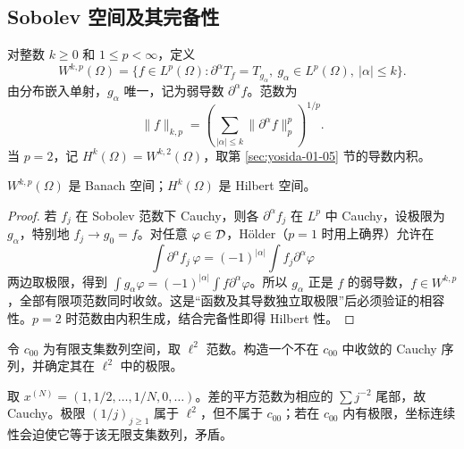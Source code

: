 \subsection{Sobolev 空间及其完备性}
\begin{definition}
对整数 $k\ge0$ 和 $1\le p<\infty$，定义
\[
 W^{k,p}(\Omega)=\{f\in L^p(\Omega):\partial^\alpha T_f=T_{g_\alpha},\
 g_\alpha\in L^p(\Omega),\ |\alpha|\le k\}.
\]
由分布嵌入单射，$g_\alpha$ 唯一，记为弱导数 $\partial^\alpha f$。范数为
\[
 \|f\|_{k,p}=\left(\sum_{|\alpha|\le k}\|\partial^\alpha f\|_p^p\right)^{1/p}.
\]
当 $p=2$，记 $H^k(\Omega)=W^{k,2}(\Omega)$，取第 \ref{sec:yosida-01-05} 节的导数内积。
\end{definition}
\begin{theorem}\label{thm:y1-sobolev-complete}
$W^{k,p}(\Omega)$ 是 Banach 空间；$H^k(\Omega)$ 是 Hilbert 空间。
\end{theorem}
\begin{proof}
若 $f_j$ 在 Sobolev 范数下 Cauchy，则各 $\partial^\alpha f_j$ 在 $L^p$ 中 Cauchy，设极限为 $g_\alpha$，特别地 $f_j\to g_0=f$。对任意 $\varphi\in\mathcal{D}$，Hölder（$p=1$ 时用上确界）允许在
\[
 \int\partial^\alpha f_j\,\varphi
 =(-1)^{|\alpha|}\int f_j\partial^\alpha\varphi
\]
两边取极限，得到 $\int g_\alpha\varphi=(-1)^{|\alpha|}\int f\partial^\alpha\varphi$。所以 $g_\alpha$ 正是 $f$ 的弱导数，$f\in W^{k,p}$，全部有限项范数同时收敛。这是“函数及其导数独立取极限”后必须验证的相容性。$p=2$ 时范数由内积生成，结合完备性即得 Hilbert 性。
\end{proof}

\begin{exercise}[补充：不完备的自然函数空间]
令 $c_{00}$ 为有限支集数列空间，取 $\ell^2$ 范数。构造一个不在 $c_{00}$ 中收敛的 Cauchy 序列，并确定其在 $\ell^2$ 中的极限。
\end{exercise}
\begin{solution}
取 $x^{(N)}=(1,1/2,\ldots,1/N,0,\ldots)$。差的平方范数为相应的 $\sum j^{-2}$ 尾部，故 Cauchy。极限 $(1/j)_{j\ge1}$ 属于 $\ell^2$，但不属于 $c_{00}$；若在 $c_{00}$ 内有极限，坐标连续性会迫使它等于该无限支集数列，矛盾。
\end{solution}
